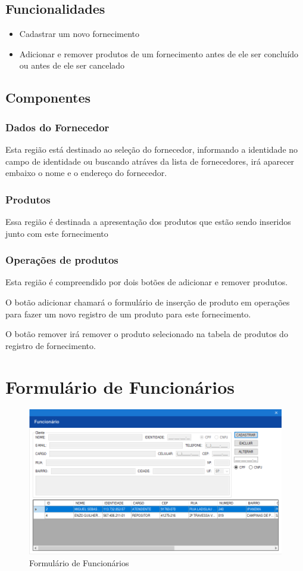 \documentclass[
	article,			%
	12pt,				%
	oneside,			%
	a4paper,			%
	english,			%
	brazil,				%
	sumario=tradicional
	]{abntex2}
\begin{document}
		\subsection{Funcionalidades}
			\begin{itemize}
			\item Cadastrar um novo fornecimento
			\item Adicionar e remover produtos de um fornecimento antes de ele ser concluído ou antes de ele ser cancelado 
			\end{itemize}
		\subsection{Componentes}
			\subsubsection{Dados do Fornecedor}
			Esta região está destinado ao seleção do fornecedor, informando a identidade no campo de identidade ou buscando atráves da lista de fornecedores, irá aparecer embaixo o nome e o endereço do fornecedor.
			\subsubsection{Produtos}
			Essa região é destinada a apresentação dos produtos que estão sendo inseridos junto com este fornecimento
			\subsubsection{Operações de produtos}
			Esta região é compreendido por dois botões de adicionar e remover produtos.
			
			O botão adicionar chamará o formulário de inserção de produto em operações para fazer um novo registro de um produto para este fornecimento.
			
			O botão remover irá remover o produto selecionado na tabela de produtos do registro de fornecimento.
	
	\newpage
	\section{Formulário de Funcionários}
		\begin{figure}[!htb]
			\centering
			\includegraphics[scale=0.6]{./Figuras/FrmFuncionario.png}
			\caption{Formulário de Funcionários}
		\end{figure}
\end{document}
